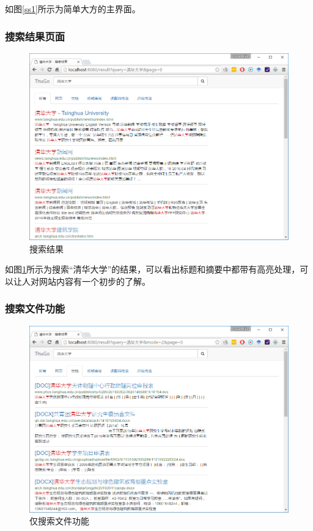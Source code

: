 \documentclass[paper=a4, fontsize=11pt, UTF8]{article} %
\numberwithin{equation}{section} %
\numberwithin{figure}{section} %
\numberwithin{table}{section} %
\begin{document}
如图\ref{ss1}所示为简单大方的主界面。

\subsubsection{搜索结果页面}

\begin{figure}[htp]
\center
\includegraphics[width=\textwidth]{ss2}
\caption{搜索结果} \label{ss2}
\end{figure}

如图\ref{ss2}所示为搜索“清华大学”的结果，可以看出标题和摘要中都带有高亮处理，可以让人对网站内容有一个初步的了解。

\subsubsection{搜索文件功能}

\begin{figure}[htp]
\center
\includegraphics[width=\textwidth]{ss3}
\caption{仅搜索文件功能} \label{ss3}
\end{figure}
\end{document}
